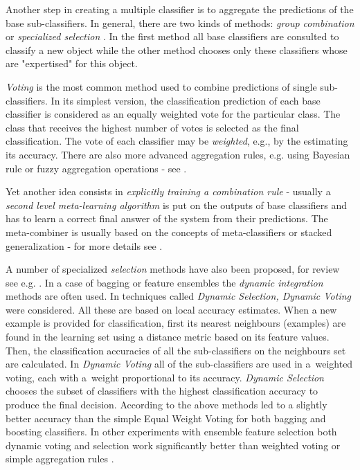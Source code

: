 \documentclass[runningheads]{llncs}
\begin{document}
Another step in creating a multiple classifier is to aggregate the
predictions of the base sub-classifiers.  In general, there are two kinds of
methods: {\em group combination} or {\em specialized selection}
\cite{Kunchevabook,Tsym3}. In the first method all base classifiers are
consulted to classify a new object while the other method chooses only these
classifiers whose are "expertised" for this object.

{\em Voting} is the most common method used to combine predictions of single
sub-classifiers. In its simplest version, the classification prediction of
each base classifier is considered as an equally weighted vote for the
particular class. The class that receives the highest number of votes is
selected as the final classification. The vote of each classifier may be
{\em weighted}, e.g., by the estimating its accuracy. There are also more
advanced aggregation rules, e.g. using Bayesian rule or fuzzy aggregation
operations - see \cite{Valenti,Kunchevabook}.


Yet another idea consists in {\em explicitly training a combination rule} -
usually a {\em second level  meta-learning algorithm} is put on the outputs
of base classifiers and has to learn a correct final answer of the system
from their predictions.  The meta-combiner is usually based on the concepts
of meta-classifiers or stacked generalization - for more details see
\cite{Tsym2}.

A number of specialized {\em selection} methods have also been proposed, for
review see e.g. \cite{Tsym2,Tsym3}. In a case of bagging or feature
ensembles the {\em dynamic integration} methods are often used. In
\cite{Tsym3} techniques called {\em Dynamic Selection, Dynamic Voting} were
considered. All these are based on local accuracy estimates. When a new
example is provided for classification, first its nearest neighbours
(examples) are found in the learning set using a distance metric based on
its feature values. Then, the classification accuracies of all the
sub-classifiers on the neighbours set are calculated. In {\em Dynamic
Voting}  all of the sub-classifiers are used in a~weighted voting, each with
a~weight proportional to its accuracy. {\em Dynamic Selection} chooses the
subset of classifiers with the highest classification accuracy to produce
the final decision. According to \cite{Tsym2} the above methods led to a
slightly better accuracy than the simple Equal Weight Voting for both
bagging and boosting classifiers. In other experiments with ensemble feature
selection both dynamic voting and selection work significantly better than
weighted voting or simple aggregation rules \cite{Tsym3}.
\end{document}
